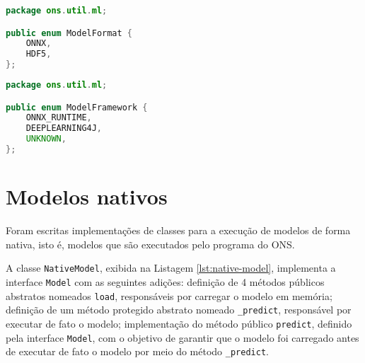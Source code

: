 \begin{lstlisting}[language=Java, caption=Implementação do \textit{enum} ModelFormat, label={lst:modelfr}]
package ons.util.ml;

public enum ModelFormat {
    ONNX,
    HDF5,
};  
\end{lstlisting}

\begin{lstlisting}[language=Java, caption=Implementação do \textit{enum} ModelFramework, label={lst:modelfrm}]
package ons.util.ml;

public enum ModelFramework {
    ONNX_RUNTIME,
    DEEPLEARNING4J,
    UNKNOWN,
};
\end{lstlisting}

\section{Modelos nativos}
\label{appendix-ons-native-model}

Foram escritas implementações de classes para a execução de modelos de forma nativa, isto é, modelos que são executados pelo programa do ONS.

A classe \texttt{NativeModel}, exibida na Listagem \ref{lst:native-model}, implementa a interface \texttt{Model} com as seguintes adições: definição de 4 métodos públicos abstratos nomeados \texttt{load}, responsáveis por carregar o modelo em memória; definição de um método protegido abstrato nomeado \texttt{\_predict}, responsável por executar de fato o modelo; implementação do método público \texttt{predict}, definido pela interface \texttt{Model}, com o objetivo de garantir que o modelo foi carregado antes de executar de fato o modelo por meio do método \texttt{\_predict}.

